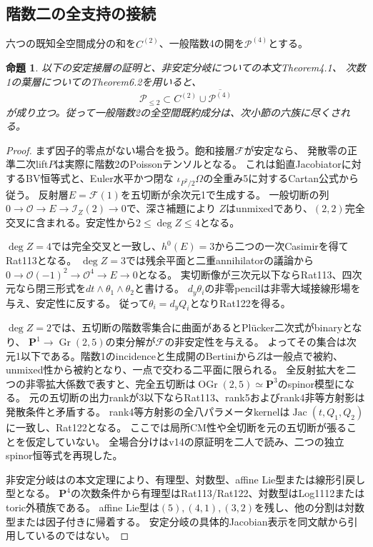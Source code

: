 \documentclass[a4paper,11pt]{ltjsarticle}
\newtheorem{proposition}{命題}[section]
\theoremstyle{definition}
\newcommand{\PP}{\mathbf P}
\begin{document}
\subsection{階数二の全支持の接続}
六つの既知全空間成分の和を\(C^{(2)}\)、一般階数4の開を\(\mathcal P^{(4)}\)とする。
\begin{proposition}\label{prop:rank2-support}
以下の安定接層の証明と、非安定分岐についての\cite{cm}本文Theorem4.1、
次数1の葉層についての\cite{lpt}Theorem6.2を用いると、
\[
 \mathcal P_{\le2}\subset C^{(2)}\cup\overline{\mathcal P^{(4)}}
\]
が成り立つ。従って一般階数2の全空間既約成分は、次小節の六族に尽くされる。
\end{proposition}
\begin{proof}
まず因子的零点がない場合を扱う。飽和接層\(\mathcal F\)が安定なら、
発散零の正準二次lift\(P\)は実際に階数2のPoissonテンソルとなる。
これは鉛直Jacobiatorに対するBV恒等式と、Euler水平かつ閉な
\(\iota_{P^2/2}\Omega\)の全重み5に対するCartan公式から従う。
反射層\(E=\mathcal F(1)\)を五切断が余次元1で生成する。
一般切断の列\(0\to\mathcal O\to E\to\mathcal I_Z(2)\to0\)で、深さ補題により
\(Z\)はunmixedであり、\((2,2)\)完全交叉に含まれる。安定性から\(2\le\deg Z\le4\)となる。

\(\deg Z=4\)では完全交叉と一致し、\(h^0(E)=3\)から二つの一次Casimirを得てRat113となる。
\(\deg Z=3\)では残余平面と二重annihilatorの議論から
\(0\to\mathcal O(-1)^2\to\mathcal O^4\to E\to0\)となる。
実切断像が三次元以下ならRat113、四次元なら閉三形式を\(dt\wedge\theta_1\wedge\theta_2\)と書ける。
\(d_y\theta_i\)の非零pencilは非零大域接線形場を与え、安定性に反する。
従って\(\theta_i=d_yQ_i\)となりRat122を得る。

\(\deg Z=2\)では、五切断の階数零集合に曲面があるとPlücker二次式がbinaryとなり、
\(\PP^1\to\operatorname{Gr}(2,5)\)の束分解が\(\mathcal F\)の非安定性を与える。
よってその集合は次元1以下である。階数1のincidenceと生成開のBertiniから\(Z\)は一般点で被約、
unmixed性から被約となり、一点で交わる二平面に限られる。
全反射拡大を二つの非零拡大係数で表すと、完全五切断は\(\operatorname{OGr}(2,5)\simeq\PP^3\)のspinor模型になる。
元の五切断の出力rankが3以下ならRat113、rank5およびrank4非等方射影は発散条件と矛盾する。
rank4等方射影の全八パラメータkernelは\(\operatorname{Jac}(t,Q_1,Q_2)\)に一致し、Rat122となる。
ここでは局所CM性や全切断を元の五切断が張ることを仮定していない。
全場合分けはv14の原証明を二人で読み、二つの独立spinor恒等式を再現した。

非安定分岐は\cite{cm}の本文定理により、有理型、対数型、affine Lie型または線形引戻し型となる。
\(\PP^4\)の次数条件から有理型はRat113/Rat122、対数型はLog1112またはtoric外積族である。
affine Lie型は\((5),(4,1),(3,2)\)を残し、他の分割は対数型または因子付きに帰着する。
安定分岐の具体的Jacobian表示を同文献から引用しているのではない。


\end{proof}
\end{document}
